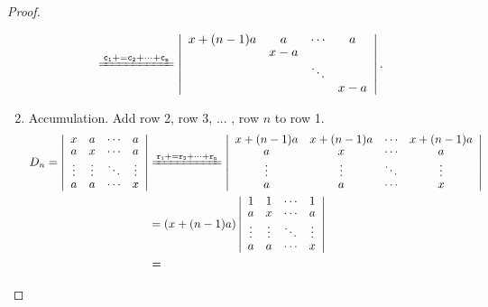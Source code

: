 \documentclass{report}
\theoremstyle{nonumberplain}
\newtheorem{proof}{Proof.}
\newcommand{\pluseq}{\mathrel{{+}{=}}}
\newcommand\scalemath[2]{\scalebox{#1}{\mbox{\ensuremath{\displaystyle #2}}}}
\begin{document}
\begin{proof}
\begin{enumerate}
\begin{equation*}
\begin{aligned}
				                                                   & \xlongequal{\mathtt{c_1\pluseq c_2+\cdots+c_n}}\left|\begin{array}{cccc}
					      x+(n-1)a & a   & \cdots & a   \\
					               & x-a &        &     \\
					               &     & \ddots &     \\
					               &     &        & x-a
				      \end{array}\right|.
			      \end{aligned}
		      \end{equation*}
		\item Accumulation. Add row 2, row 3, ... , row $n$ to row 1.
		      \begin{equation*}
			      \begin{aligned}
				      D_{n}=\left|\begin{array}{cccc}
					      x      & a      & \cdots & a      \\
					      a      & x      & \cdots & a      \\
					      \vdots & \vdots & \ddots & \vdots \\
					      a      & a      & \cdots & x
				      \end{array}\right| & \xlongequal{\mathtt{r_1\pluseq r_2+\cdots+r_n}}
				      \left|\begin{array}{cccc}
					      x+(n-1)a & x+(n-1)a & \cdots & x+(n-1)a \\
					      a        & x        & \cdots & a        \\
					      \vdots   & \vdots   & \ddots & \vdots   \\
					      a        & a        & \cdots & x
				      \end{array}\right|                                                                                \\
				                                                   & =\left(x+(n-1)a\right)\left|\begin{array}{cccc}
					      1      & 1      & \cdots & 1      \\
					      a      & x      & \cdots & a      \\
					      \vdots & \vdots & \ddots & \vdots \\
					      a      & a      & \cdots & x
				      \end{array}\right|          \\
				                                                   & \xlongequal{\scalemath{0.65}{\arraycolsep=1.4pt\def\arraystretch{0.85}
}}
\end{aligned}
\end{equation*}
\end{enumerate}
\end{proof}
\end{document}
